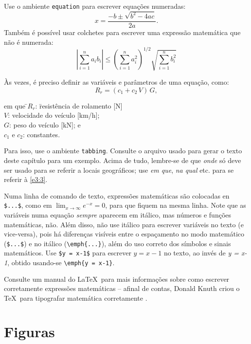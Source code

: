 Use o ambiente \texttt{equation} para escrever
equações  numeradas:
\begin{equation}
  x = \frac{-b \pm \sqrt{b^2-4ac}}{2a}.
\end{equation}
Também é possível usar colchetes para escrever uma expressão
matemática que não é numerada:
\[
\left|\sum_{i=1}^n a_ib_i\right|
\le
\left(\sum_{i=1}^n a_i^2\right)^{1/2}
\sqrt{\sum_{i=1}^n b_i^2}
\]

Às vezes, é preciso definir as variáveis e parâmetros de uma equação, 
como:
    \begin{equation}
    R_{r} = ( c_{1} + c_{2} \, V) \, G,
    \label{e3:3}
    \end{equation}
\begin{tabbing}
   em que \hspace{1em}
   \=$R_{r}$:  \hspace{2.3em}  \=resistência de rolamento [N] \\
   \>$V$:   \> velocidade do veículo [km/h]; \\
   \>$G$:   \> peso do veículo [kN]; e \\
   \>$c_1$ e $c_2$: \> constantes.
\end{tabbing}
Para isso, use o ambiente \texttt{tabbing}. Consulte o arquivo
usado para gerar o texto deste capítulo para um exemplo. Acima de 
tudo, lembre-se de que \emph{onde} só deve ser usado para se 
referir a locais geográficos; use \emph{em que}, \emph{na qual} etc.
para se referir à \autoref{e3:3}.

Numa linha de comando de texto, expressões matemáticas são colocadas en
\verb|$...$|, como em $ \lim_{x \to \infty} e^{-x} = 0 $, para que 
fiquem na mesma linha. Note que as variáveis numa
equação \emph{sempre} aparecem em itálico, mas números e funções matemáticas,
não. Além disso, não use itálico para escrever variáveis
no texto (e vice-versa), pois há diferenças visíveis entre o espaçamento 
no modo matemático (\verb|$...$|) e no itálico (\verb|\emph{...}|), além
do uso correto dos símbolos e sinais matemáticos. 
Use \verb|$y = x-1$| para escrever $y = x-1$ no texto,
ao invés de \emph{y = x-1}, obtido usando-se \verb|\emph{y = x-1}|.

Consulte um manual do \LaTeX\ para mais informações sobre como
escrever corretamente expressões matemáticas -- afinal de contas,
Donald Knuth criou o \TeX\ para tipografar matemática corretamente
\cite[p.~xiii]{LaTeX}.

\section{Figuras}

